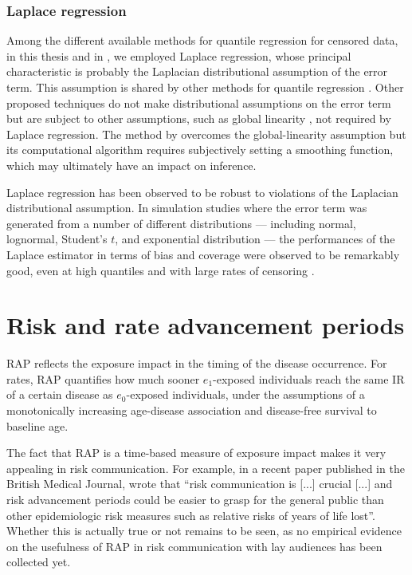 \subsubsection{Laplace regression}

Among the different available methods for quantile regression for censored data, in this thesis and in , we employed Laplace regression, whose principal characteristic is probably the Laplacian distributional assumption of the error term. This assumption is shared by other methods for quantile regression \citep{liu_mixedeffects_2009, farcomeni_quantile_2010, lee_bayesian_2010, yuan_bayesian_2010}. Other proposed techniques do not make distributional assumptions on the error term but are subject to other assumptions, such as global linearity \citep{portnoy_censored_2003, peng_survival_2008}, not required by Laplace regression. The method by \citet{wang_locally_2009} overcomes the global-linearity assumption but its computational algorithm requires subjectively setting a smoothing function, which may ultimately have an impact on inference.

 Laplace regression has been observed to be robust to violations of the Laplacian distributional assumption. In simulation studies where the error term was generated from a number of different distributions --- including normal, lognormal, Student's $t$, and exponential distribution --- the performances of the Laplace estimator in terms of bias and coverage were observed to be remarkably good, even at high quantiles and with large rates of censoring \citep{bottai_laplace_2010,bottai_authors_2011,bottai_command_2013,bottai_gradient_2015}. 

\section{Risk and rate advancement periods}

RAP reflects the exposure impact in the timing of the disease occurrence. For rates, RAP quantifies how much sooner $e_1$-exposed individuals reach the same IR of a certain disease as $e_0$-exposed individuals, under the assumptions of a monotonically increasing age-disease association and disease-free survival to baseline age. 

The fact that RAP is a time-based measure of exposure impact makes it very appealing in risk communication. For example, in a recent paper published in the British Medical Journal, \citet{mons_impact_2015} wrote that ``risk communication is [...] crucial [...] and risk advancement periods could be easier to grasp for the general public than other epidemiologic risk measures such as relative risks of years of life lost''. Whether this is actually true or not remains to be seen, as no empirical evidence on the usefulness of RAP in risk communication with lay audiences has been collected yet.

